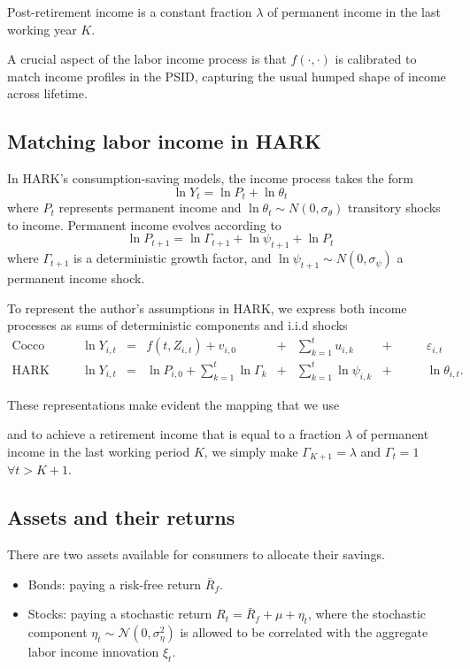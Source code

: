 \documentclass[./CGMPortfolio.tex]{subfiles}
\begin{document}
Post-retirement income is a constant fraction $\lambda$ of permanent income in the last working year $K$.

A crucial aspect of the labor income process is that $f(\cdot,\cdot)$ is calibrated to match income profiles in the PSID, capturing the usual humped shape of income across lifetime.

\subsection{Matching labor income in HARK}

In HARK's consumption-saving models, the income process takes the form
\begin{equation}
\ln Y_t = \ln P_t + \ln \theta_t
\end{equation}
where $P_t$ represents permanent income and $\ln \theta_t \sim N(0,\sigma_\theta)$ transitory shocks to income. Permanent income evolves according to
\begin{equation}
\ln P_{t+1} = \ln \Gamma_{t+1} +  \ln \psi_{t+1} + \ln P_t
\end{equation}
where $\Gamma_{t+1}$ is a deterministic growth factor, and $\ln \psi_{t+1} \sim N(0,\sigma_\psi)$ a permanent income shock. 


To represent the author's assumptions in HARK, we express both income processes as sums of deterministic components and i.i.d shocks
\begin{align}
\text{Cocco et. al} &\quad& \ln Y_{i,t} &=& f(t,Z_{i,t}) + v_{i,0} &+&\sum_{k=1}^t u_{i,k} &+&\qquad \varepsilon_{i,t} \\
\text{HARK}        &\quad& \ln Y_{i,t} &=& \ln P_{i,0} + \sum_{k=1}^t \ln \Gamma_k &+&\sum_{k=1}^t \ln \psi_{i,k} &+& \qquad \ln \theta_{i,t}.
\end{align}

These representations make evident the mapping that we use

and to achieve a retirement income that is equal to a fraction $\lambda$ of 
permanent income in the last working period $K$, we simply make $\Gamma_{K+1} = 
\lambda$ and $\Gamma_{t} = 1$ $\forall t>K+1$.

\subsection{Assets and their returns}

There are two assets available for consumers to allocate their savings.
\begin{itemize}
	\item Bonds: paying a risk-free return $\bar{R}_f$.

	\item Stocks: paying a stochastic return $R_t = \bar{R}_f + \mu + \eta_t$, where the stochastic component $\eta_t \sim \mathcal{N}(0, \sigma^2_\eta)$ is allowed to be correlated with the aggregate labor income innovation $\xi_t$.
	
\end{itemize}
\end{document}
